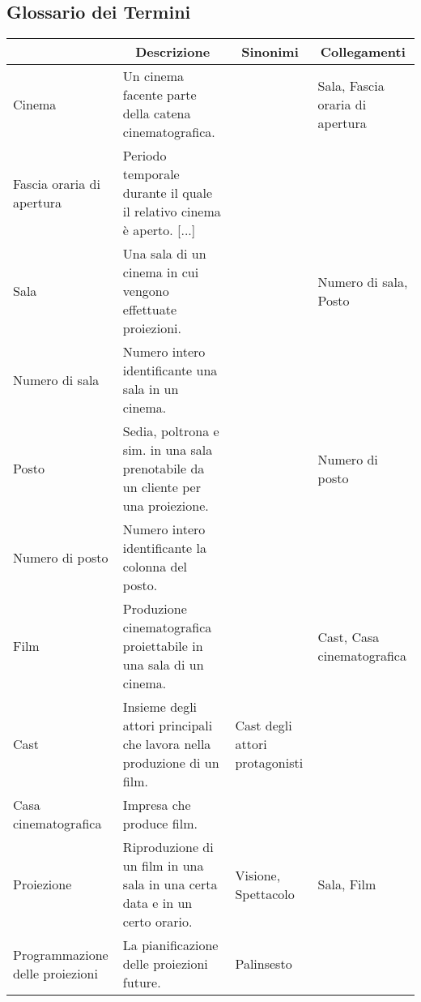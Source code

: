 \subsection*{Glossario dei Termini}
%
%
\begin{longtable}{|p{3.86cm}|p{3.86cm}|p{3.86cm}|p{3.86cm}|}
      \hline
      \rowcolor{tblhdrcolor}
      \multicolumn{1}{|c|}{\textbf{Termine}}
       & \multicolumn{1}{|c|}{\textbf{Descrizione}}
       & \multicolumn{1}{|c|}{\textbf{Sinonimi}}
       & \multicolumn{1}{|c|}{\textbf{Collegamenti}}
      \\\hline
      Cinema
       & Un cinema facente parte della catena cinematografica.
       &
       & Sala, Fascia oraria di apertura
      \\\hline
      Fascia oraria di apertura
       & Periodo temporale durante il quale il relativo cinema è aperto. [...]
       &
       &
      \\ \hline
      Sala
       & Una sala di un cinema in cui vengono effettuate proiezioni.
       &
       & Numero di sala, Posto
      \\\hline
      Numero di sala
       & Numero intero identificante una sala in un cinema.
       &
       &
      \\\hline
      Posto
       & Sedia, poltrona e sim. in una sala prenotabile da un cliente
      per una proiezione.
       &
       & Numero di posto
      \\\hline
      Numero di posto
       & Numero intero identificante la colonna del posto.
       &
       &
      \\\hline
      Film
       & Produzione cinematografica proiettabile in una sala di un cinema.
       &
       & Cast, Casa cinematografica
      \\\hline
      Cast
       & Insieme degli attori principali che lavora nella produzione di un film.
       & Cast degli attori protagonisti
       &
      \\\hline
      Casa cinematografica
       & Impresa che produce film.
       &
       &
      \\ \hline
      Proiezione
       & Riproduzione di un film in una sala in una certa data e in un
      certo orario.
       & Visione, Spettacolo
       & Sala, Film
      \\ \hline
      Programmazione delle proiezioni
       & La pianificazione delle proiezioni future.
       & Palinsesto

\end{longtable}
